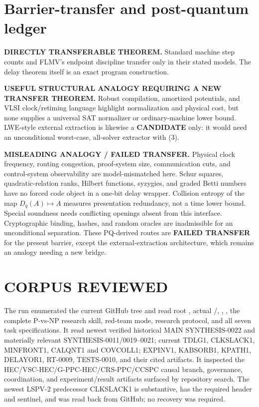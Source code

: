 \documentclass[11pt]{article}
\newcommand{\CAND}{\textbf{CANDIDATE}}
\begin{document}
\section{Barrier-transfer and post-quantum ledger}

\textbf{DIRECTLY TRANSFERABLE THEOREM.}  Standard machine step counts and
FLMV's endpoint discipline transfer only in their stated models.  The delay
theorem itself is an exact program construction.

\textbf{USEFUL STRUCTURAL ANALOGY REQUIRING A NEW TRANSFER THEOREM.}
Robust compilation, amortized potentials, and VLSI clock/retiming language
highlight normalization and physical cost, but none supplies a universal SAT
normalizer or ordinary-machine lower bound.  LWE-style external extraction is
likewise a \CAND{} only: it would need an unconditional worst-case, all-solver
extractor with (3).

\textbf{MISLEADING ANALOGY / FAILED TRANSFER.}  Physical clock frequency,
routing congestion, proof-system size, communication cuts, and control-system
observability are model-mismatched here.  Schur squares, quadratic-relation
ranks, Hilbert functions, syzygies, and graded Betti numbers have no forced
code object in a one-bit delay wrapper.  Collision entropy of the map
$D_q(A)\mapsto A$ measures presentation redundancy, not a time lower bound.
Special soundness needs conflicting openings absent from this interface.
Cryptographic binding, hashes, and random oracles are inadmissible for an
unconditional separation.  These PQ-derived routes are \textbf{FAILED
TRANSFER} for the present barrier, except the external-extraction architecture,
which remains an analogy needing a new bridge.

\section{CORPUS REVIEWED}

The run enumerated the current GitHub tree and read root ,
actual /, , ,
the complete P-vs-NP research skill, red-team mode, research protocol, and all
seven task specifications.  It read newest verified historical MAIN
SYNTHESIS-0022 and materially relevant SYNTHESIS-0011/0019--0021; current
TDLG1, CLKSLACK1, MINFRONT1, CALQNT1 and COVCOLL1; EXPINV1, KABSORB1, KPATH1,
DELAYOR1, RT-0009, TESTS-0010, and their cited artifacts.  It inspected the
HEC/VSC-HEC/G-PPC-HEC/CRS-PPC/CCSPC causal branch, governance, coordination,
and experiment/result artifacts surfaced by repository search.  The newest
LSPV-2 predecessor CLKSLACK1 is substantive, has the required header and
sentinel, and was read back from GitHub; no recovery was required.
\end{document}
